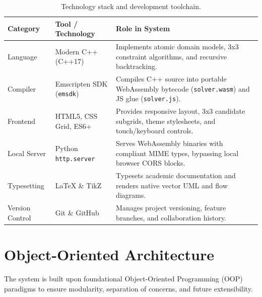 \documentclass[12pt,a4paper,oneside]{book}
\begin{document}
\begin{table}[htbp]
\centering
\begin{tabularx}{\textwidth}{l p{4.2cm} X}
\toprule
\textbf{Category} & \textbf{Tool / Technology} & \textbf{Role in System} \\
\midrule
Language & Modern C++ (C++17) & Implements atomic domain models, 3x3 constraint algorithms, and recursive backtracking. \\
Compiler & Emscripten SDK (\texttt{emsdk}) & Compiles C++ source into portable WebAssembly bytecode (\texttt{solver.wasm}) and JS glue (\texttt{solver.js}). \\
Frontend & HTML5, CSS Grid, ES6+ & Provides responsive layout, 3x3 candidate subgrids, theme stylesheets, and touch/keyboard controls. \\
Local Server & Python \texttt{http.server} & Serves WebAssembly binaries with compliant MIME types, bypassing local browser CORS blocks. \\
Typesetting & LaTeX \& TikZ & Typesets academic documentation and renders native vector UML and flow diagrams. \\
Version Control & Git \& GitHub & Manages project versioning, feature branches, and collaboration history. \\
\bottomrule
\end{tabularx}
\caption{Technology stack and development toolchain.}
\label{tab:tools}
\end{table}

\section{Object-Oriented Architecture}
The system is built upon foundational Object-Oriented Programming (OOP) paradigms to ensure modularity, separation of concerns, and future extensibility.
\end{document}
